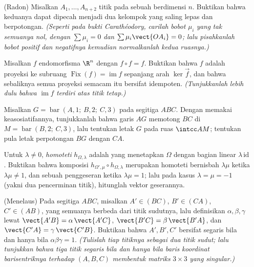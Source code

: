 \begin{exercise}[$\star\star\star$]\label{exo:b2:affine:7}
(Radon) Misalkan $A_1, \dots, A_{n+2}$ titik pada sebuah 
berdimensi $n$. Buktikan bahwa keduanya dapat dipecah menjadi dua kelompok
yang saling lepas dan  berpotongan. \emph{(Seperti pada bukti
Carathéodory, carilah bobot $\mu_i$ yang tak semuanya nol, dengan $\sum\mu_i = 0$ dan
$\sum\mu_i\vect{OA_i} = 0$; lalu pisahkanlah bobot positif dan negatifnya
kemudian normalkanlah kedua ruasnya.)}
\end{exercise}

\begin{exercise}[$\star\star\star$]\label{exo:b2:affine:8}
Misalkan $f$ endomorfisma  $\R^n$ dengan $f \circ f = f$.
Buktikan bahwa $f$ adalah proyeksi  ke subruang 
$\operatorname{Fix}(f) = \operatorname{im} f$ sepanjang arah
$\ker\vec f$, dan bahwa sebaliknya semua proyeksi semacam itu bersifat
idempoten. \emph{(Tunjukkanlah lebih dulu bahwa $\operatorname{im} f$ terdiri
atas titik tetap.)}
\end{exercise}

\begin{exercise}[$\star$]\label{exo:b2:affine:9}
Misalkan $G = \operatorname{bar}(A, 1;\ B, 2;\ C, 3)$ pada segitiga
$ABC$. Dengan memakai keasosiatifannya, tunjukkanlah bahwa garis $AG$ memotong $BC$
di $M = \operatorname{bar}(B, 2;\ C, 3)$, lalu tentukan letak $G$ pada
ruas $\intcc AM$; tentukan pula letak perpotongan $BG$
dengan $CA$.
\end{exercise}

\begin{exercise}[$\star\star$]\label{exo:b2:affine:10}
Untuk $\lambda \neq 0$, \emph{homoteti} $h_{\Omega,
\lambda}$ adalah  yang menetapkan $\Omega$ dengan bagian linear
$\lambda\,\mathrm{id}$. Buktikan bahwa komposisi
$h_{\Omega', \mu} \circ h_{\Omega, \lambda}$ merupakan homoteti
bernisbah $\lambda\mu$ ketika $\lambda\mu \neq 1$, dan sebuah penggeseran
ketika $\lambda\mu = 1$; lalu pada kasus $\lambda = \mu = -1$ (yakni dua
pencerminan titik), hitunglah vektor geserannya.
\end{exercise}

\begin{exercise}[$\star\star$]\label{exo:b2:affine:11}
(Menelaus) Pada segitiga $ABC$, misalkan $A' \in (BC)$, $B' \in
(CA)$, $C' \in (AB)$, yang semuanya berbeda dari titik sudutnya, lalu
definisikan $\alpha, \beta, \gamma$ lewat $\vect{A'B} =
\alpha\,\vect{A'C}$, $\vect{B'C} = \beta\,\vect{B'A}$, dan
$\vect{C'A} = \gamma\,\vect{C'B}$. Buktikan bahwa $A', B', C'$ bersifat
segaris bila dan hanya bila $\alpha\beta\gamma = 1$. \emph{(Tulislah
tiap titiknya sebagai  dua titik sudut; lalu tunjukkan bahwa tiga
titik segaris bila dan hanya bila baris koordinat barisentriknya terhadap
$(A, B, C)$ membentuk matriks $3 \times 3$ yang singular.)}
\end{exercise}

